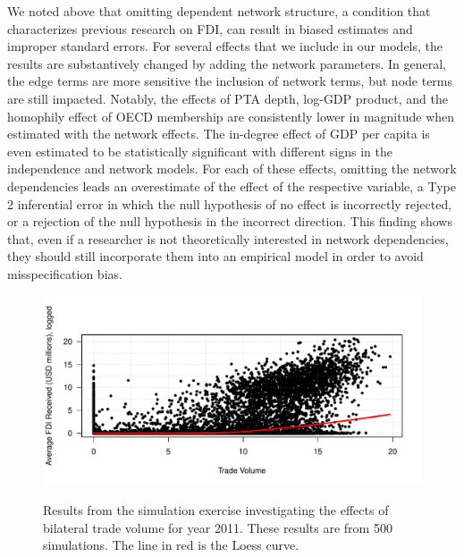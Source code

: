 \documentclass[reqno,onecolumn,letterpaper,12pt]{article}
\begin{document}
We noted above that omitting dependent network structure, a condition that characterizes previous research on FDI, can result in biased estimates and improper standard errors.  For several effects that we include in our models, the results are substantively changed by adding the network parameters. In general, the edge terms are more sensitive the inclusion of network terms, but node terms are still impacted. Notably, the effects of PTA depth, log-GDP product, and the homophily effect of OECD membership are consistently lower in magnitude when estimated with the network effects. The in-degree effect of GDP per capita is even estimated to be statistically significant with different signs in the independence and network models.  For each of these effects, omitting the network dependencies leads an overestimate of the effect of the respective variable, a Type 2 inferential error in which the null hypothesis of no effect is incorrectly rejected, or a rejection of the null hypothesis in the incorrect direction. This finding shows that, even if a researcher is not theoretically interested in network dependencies, they should still incorporate them into an empirical model in order to avoid misspecification bias.

\begin{figure}[!h]
\centering
\includegraphics[scale=.75]{./figures/tradevol_sims} \vspace{-.5cm}\\
\caption{\label{fig:tradevol} Results from the simulation exercise investigating the effects of bilateral trade volume  for year 2011. These results are from 500 simulations. The line in red is the Loess curve.}
\end{figure}
\end{document}

